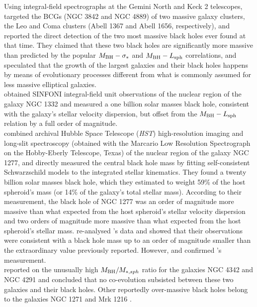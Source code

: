 Using integral-field spectrographs at the Gemini North and Keck 2 telescopes, 
\cite{mcconnell2011} targeted the BCGs (NGC 3842 and NGC 4889) of two massive galaxy clusters, 
the Leo and Coma clusters (Abell 1367 and Abell 1656, respectively), 
and reported the direct detection of the two most massive black holes ever found at that time. 
They claimed that these two black holes are significantly more massive 
than predicted by the popular $M_{\rm BH} - \sigma_*$ and $M_{\rm BH} - L_{\rm sph}$ correlations, 
and speculated that the growth of the largest galaxies and their black holes happens by means of evolutionary processes 
different from what is commonly assumed for less massive elliptical galaxies. \\

\cite{rusli2011} obtained SINFONI integral-field unit observations of the nuclear region of the galaxy NGC 1332 
and measured a one billion solar masses black hole, 
consistent with the galaxy's stellar velocity dispersion, 
but offset from the $M_{\rm BH} - L_{\rm sph}$ relation by a full order of magnitude. \\

\cite{vandenbosch2012} combined archival Hubble Space Telescope (\emph{HST}) high-resolution imaging 
and long-slit spectroscopy (obtained with the Marcario Low Resolution Spectrograph on the Hobby-Eberly Telescope, Texas) 
of the nuclear region of the galaxy NGC 1277, 
and directly measured the central black hole mass by fitting self-consistent Schwarzschild models 
to the integrated stellar kinematics. 
They found a twenty billion solar masses black hole, 
which they estimated to weight 59\% of the host spheroid's mass (or 14\% of the galaxy's total stellar mass). 
According to their measurement, 
the black hole of NGC 1277 was an order of magnitude more massive than what expected from the host spheroid's stellar velocity dispersion 
and two orders of magnitude more massive than what expected from the host spheroid's stellar mass.
\cite{emsellem2013} re-analysed \citeauthor{vandenbosch2012}'s data 
and showed that their observations were consistent with a black hole mass up to an order of magnitude smaller 
than the extraordinary value previously reported. 
However, \cite{yildirim2015} and \cite{scharwachter2016} confirmed \citeauthor{vandenbosch2012}'s measurement. \\

\cite{bogdan2012} reported on the unusually high $M_{\rm BH}/M_{*,sph}$ ratio for the galaxies NGC 4342 and NGC 4291 
and concluded that no co-evolution subsisted between these two galaxies and their black holes. 
Other reportedly over-massive black holes belong to the galaxies NGC 1271 \citep{walsh2015} and Mrk 1216 \citep{yildirim2015}. \\

